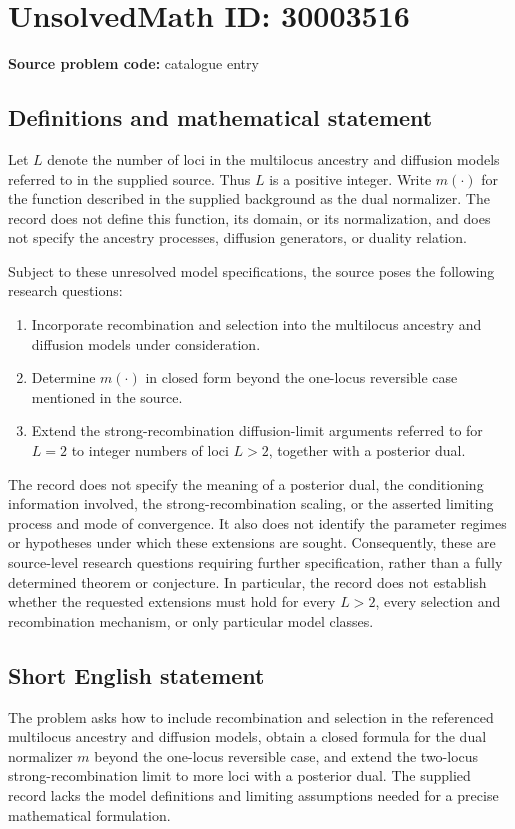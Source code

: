 \documentclass[11pt]{article}
\begin{document}
\section*{UnsolvedMath ID: 30003516}
\textbf{Source problem code:} catalogue entry
\subsection{Definitions and mathematical statement}
Let \(L\) denote the number of loci in the multilocus ancestry and diffusion models referred to in the supplied source. Thus \(L\) is a positive integer. Write \(m(\cdot)\) for the function described in the supplied background as the dual normalizer. The record does not define this function, its domain, or its normalization, and does not specify the ancestry processes, diffusion generators, or duality relation.

Subject to these unresolved model specifications, the source poses the following research questions:
\begin{enumerate}
\item Incorporate recombination and selection into the multilocus ancestry and diffusion models under consideration.
\item Determine \(m(\cdot)\) in closed form beyond the one-locus reversible case mentioned in the source.
\item Extend the strong-recombination diffusion-limit arguments referred to for \(L=2\) to integer numbers of loci \(L>2\), together with a posterior dual.
\end{enumerate}
The record does not specify the meaning of a posterior dual, the conditioning information involved, the strong-recombination scaling, or the asserted limiting process and mode of convergence. It also does not identify the parameter regimes or hypotheses under which these extensions are sought. Consequently, these are source-level research questions requiring further specification, rather than a fully determined theorem or conjecture. In particular, the record does not establish whether the requested extensions must hold for every \(L>2\), every selection and recombination mechanism, or only particular model classes.
\subsection{Short English statement}
The problem asks how to include recombination and selection in the referenced multilocus ancestry and diffusion models, obtain a closed formula for the dual normalizer \(m\) beyond the one-locus reversible case, and extend the two-locus strong-recombination limit to more loci with a posterior dual. The supplied record lacks the model definitions and limiting assumptions needed for a precise mathematical formulation.
\end{document}
